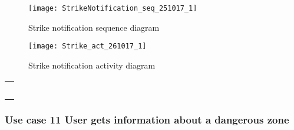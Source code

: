 \documentclass[a4paper,leqno]{book}
\begin{document}
\begin{figure}[!h]
	\begin{center}
		\texttt{[image: StrikeNotification\_seq\_251017\_1]}
	\end{center}
	\caption{Strike notification sequence diagram}
\end{figure}

\newpage

\begin{figure}[!h]
	\begin{center}
		\texttt{[image: Strike\_act\_261017\_1]}
	\end{center}
	\caption{Strike notification activity diagram}
\end{figure}


\newpage
\begin{tabular}[c]{@{}l@{}}\\ \\ \\ \\ \\ \\ \end{tabular}
\subsubsection{Use case 11  User gets information about a dangerous zone}
\end{document}
